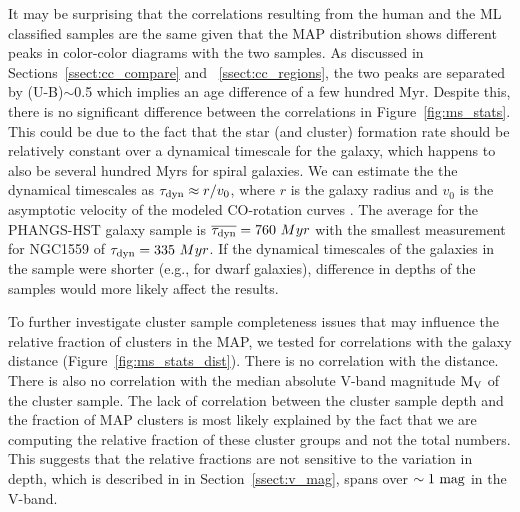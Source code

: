 \documentclass[linenumbers]{aastex63}
\begin{document}
It may be surprising that the correlations resulting from the human and the ML classified samples are the same given that the MAP distribution shows different peaks in color-color diagrams with the two samples.  As discussed in Sections~\ref{ssect:cc_compare} and  ~\ref{ssect:cc_regions}, the two peaks are separated by (U-B)$\sim$0.5 which implies an age difference of a few hundred Myr.  Despite this, there is no significant difference between the correlations in Figure~\ref{fig:ms_stats}.  This could be due to the fact that the star (and cluster) formation rate should be relatively constant over a dynamical timescale for the galaxy, which happens to also be several hundred Myrs for spiral galaxies.
We can estimate the the dynamical timescales as $\tau_{\rm dyn} \approx r / v_0$, where $r$ is the galaxy radius and $v_0$ is the asymptotic velocity of the modeled CO-rotation curves \citep{lang_phangs_2020}. The average for the PHANGS-HST galaxy sample is $\overline{\tau_{\rm dyn}} = 760~{Myr}$ with the smallest measurement for NGC1559 of $\tau_{\rm dyn}=335~{Myr}$. 
If the dynamical timescales of the galaxies in the sample were shorter (e.g., for dwarf galaxies), difference in depths of the samples would more likely affect the results.




To further investigate cluster sample completeness issues that may influence the relative fraction of clusters in the MAP, we tested for correlations with the galaxy distance (Figure~\ref{fig:ms_stats_dist}). There is no correlation with the distance. 
There is also no correlation with the median absolute V-band magnitude ${\rm M_V}$ of the cluster sample. 
The lack of correlation between the cluster sample depth and the fraction of MAP clusters is most likely explained by the fact that we are computing the relative fraction of these cluster groups and not the total numbers. 
This suggests that the relative fractions are not sensitive to the variation in depth, which is described in in Section~\ref{ssect:v_mag}, spans over $\sim 1~{\rm mag}$ in the V-band.

\end{document}
